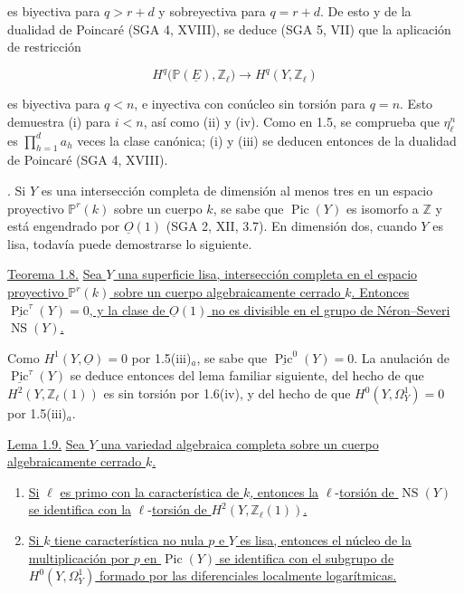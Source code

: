 \pageoriginale

es biyectiva para $q>r+d$ y sobreyectiva para $q=r+d$. De esto y de la
dualidad de Poincaré (SGA 4, XVIII), se deduce (SGA 5, VII) que la aplicación
de restricción

\begin{equation*}
H^q\bigl(\mathbb P(\underline E),\mathbb Z_\ell\bigr)
\longrightarrow H^q(Y,\mathbb Z_\ell)
\end{equation*}

es biyectiva para $q<n$, e inyectiva con conúcleo sin torsión para $q=n$.
Esto demuestra (i) para $i<n$, así como (ii) y (iv). Como en 1.5, se
comprueba que $\eta_\ell^n$ es $\prod_{h=1}^d a_h$ veces la clase canónica;
(i) y (iii) se deducen entonces de la dualidad de Poincaré (SGA 4, XVIII).

\medskip
{}. Si $Y$ es una intersección completa de dimensión al menos
tres en un espacio proyectivo $\mathbb P^r(k)$ sobre un cuerpo $k$, se sabe
que $\operatorname{Pic}(Y)$ es isomorfo a $\mathbb Z$ y está engendrado por
$\underline O(1)$ (SGA 2, XII, 3.7). En dimensión dos, cuando $Y$ es lisa,
todavía puede demostrarse lo siguiente.

\medskip
\noindent\underline{Teorema 1.8.}\quad
\underline{Sea $Y$ una superficie lisa, intersección completa en el espacio
proyectivo $\mathbb P^r(k)$ sobre un cuerpo algebraicamente cerrado $k$.
Entonces $\underline{\operatorname{Pic}}^\tau(Y)=0$, y la clase de
$\underline O(1)$ no es divisible en el grupo de Néron--Severi
$\operatorname{NS}(Y)$.}

Como $H^1(Y,\underline O)=0$ por 1.5(iii)$_a$, se sabe que
$\underline{\operatorname{Pic}}^0(Y)=0$. La anulación de
$\underline{\operatorname{Pic}}^\tau(Y)$ se deduce entonces del lema
familiar siguiente, del hecho de que $H^2(Y,\mathbb Z_\ell(1))$ es sin
torsión por 1.6(iv), y del hecho de que $H^0(Y,\Omega_Y^1)=0$ por
1.5(iii)$_a$.

\medskip
\noindent\underline{Lema 1.9.}\quad
\underline{Sea $Y$ una variedad algebraica completa sobre un cuerpo
algebraicamente cerrado $k$.}

\begin{enumerate}[label=(\roman*),leftmargin=2.6em]
\item \underline{Si} $\ell$ \underline{es primo con la característica de $k$, entonces
la} $\ell$-\underline{torsión de $\operatorname{NS}(Y)$ se identifica con la}
$\ell$-\underline{torsión de $H^2(Y,\mathbb Z_\ell(1))$.}

\pageoriginale

\item \underline{Si $k$ tiene característica no nula $p$ e $Y$ es lisa,
entonces el núcleo de la multiplicación por $p$ en $\operatorname{Pic}(Y)$
se identifica con el subgrupo de $H^0(Y,\Omega_Y^1)$ formado por las
diferenciales localmente logarítmicas.}
\end{enumerate}

